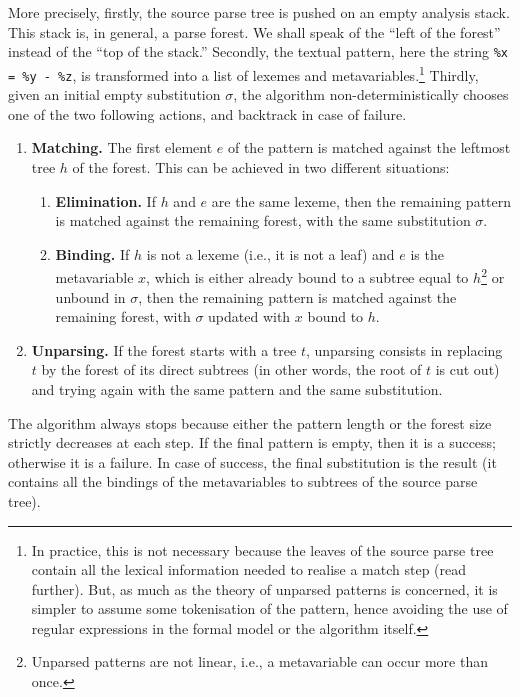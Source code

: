 More precisely, firstly, the source parse tree is pushed on an empty
analysis stack. This stack is, in general, a parse forest. We shall
speak of the ``left of the forest'' instead of the ``top of the
stack.'' Secondly, the textual pattern, here the string \texttt{\%x =
\%y - \%z}, is transformed into a list of lexemes and
meta\-variables.\footnote{In practice, this is not necessary because
the leaves of the source parse tree contain all the lexical
information needed to realise a match step (read further). But, as
much as the theory of unparsed patterns is concerned, it is simpler to
assume some tokenisation of the pattern, hence avoiding the use of
regular expressions in the formal model or the algorithm itself.}
Thirdly, given an initial empty substitution \(\sigma\), the algorithm
non\hyp{}deterministically chooses one of the two following actions,
and backtrack in case of failure.
\begin{enumerate}

  \item \textbf{Matching.} The first element \(e\) of the pattern is
    matched against the leftmost tree \(h\) of the forest. This can be
    achieved in two different situations:
    \begin{enumerate}

      \item \textbf{Elimination.} If \(h\) and \(e\) are the same
        lexeme, then the remaining pattern is matched against the
        remaining forest, with the same substitution \(\sigma\).

      \item \textbf{Binding.} If \(h\) is not a lexeme (i.e., it is
        not a leaf) and \(e\) is the meta\-variable \(x\), which is
        either already bound to a subtree equal to
        \(h\)\footnote{Unparsed patterns are not linear, i.e., a
        meta\-variable can occur more than once.} or unbound in
        \(\sigma\), then the remaining pattern is matched against the
        remaining forest, with \(\sigma\) updated with \(x\) bound to
        \(h\).

  \end{enumerate}

  \item \textbf{Unparsing.} If the forest starts with a tree \(t\),
    unparsing consists in replacing \(t\) by the forest of its direct
    subtrees (in other words, the root of \(t\) is cut out) and trying
    again with the same pattern and the same substitution.

\end{enumerate}
The algorithm always stops because either the pattern length or the
forest size strictly decreases at each step. If the final pattern is
empty, then it is a success; otherwise it is a failure. In case of
success, the final substitution is the result (it contains all the
bindings of the meta\-variables to subtrees of the source parse tree).


